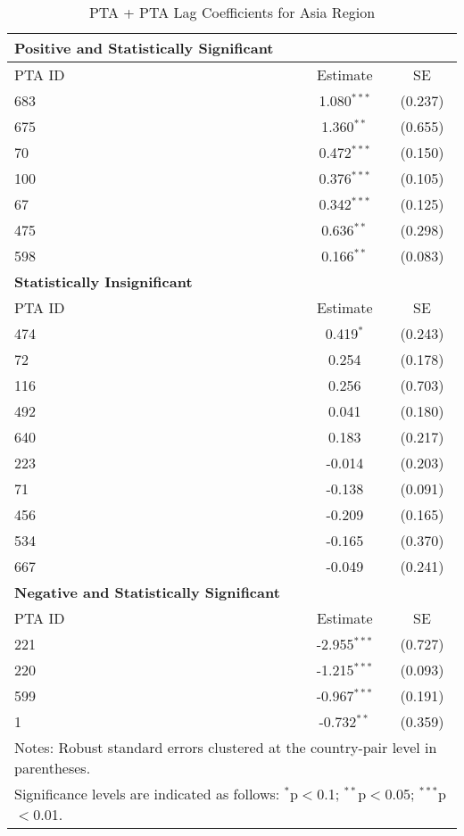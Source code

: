 \begin{table}[htbp]
    \centering
    \caption{PTA + PTA Lag Coefficients for Asia Region}
    \label{tab:pta_asia}
    \begin{adjustbox}{max width=\textwidth}
    \begin{tabular}{lcc}
    \hline
    \textbf{Positive and Statistically Significant} &  &  \\
    \hline
    PTA ID & Estimate & SE \\
    \hline
    683 & 1.080$^{\ast\ast\ast}$ & (0.237) \\
    675 & 1.360$^{\ast\ast}$ & (0.655) \\
    70  & 0.472$^{\ast\ast\ast}$ & (0.150) \\
    100 & 0.376$^{\ast\ast\ast}$ & (0.105) \\
    67  & 0.342$^{\ast\ast\ast}$ & (0.125) \\
    475 & 0.636$^{\ast\ast}$ & (0.298) \\
    598 & 0.166$^{\ast\ast}$ & (0.083) \\
    \hline
    \textbf{Statistically Insignificant} &  &  \\
    \hline
    PTA ID & Estimate & SE \\
    \hline
    474 & 0.419$^{\ast}$ & (0.243) \\
    72  & 0.254 & (0.178) \\
    116 & 0.256 & (0.703) \\
    492 & 0.041 & (0.180) \\
    640 & 0.183 & (0.217) \\
    223 & -0.014 & (0.203) \\
    71  & -0.138 & (0.091) \\
    456 & -0.209 & (0.165) \\
    534 & -0.165 & (0.370) \\
    667 & -0.049 & (0.241) \\
    \hline
    \textbf{Negative and Statistically Significant} &  &  \\
    \hline
    PTA ID & Estimate & SE \\
    \hline
    221 & -2.955$^{\ast\ast\ast}$ & (0.727) \\
    220 & -1.215$^{\ast\ast\ast}$ & (0.093) \\
    599 & -0.967$^{\ast\ast\ast}$ & (0.191) \\
    1   & -0.732$^{\ast\ast}$ & (0.359) \\
    \hline
    \multicolumn{3}{l}{\footnotesize{Notes: Robust standard errors clustered at the country-pair level in parentheses.}} \\
    \multicolumn{3}{l}{\footnotesize{Significance levels are indicated as follows: $^{\ast}$p$<$0.1; $^{\ast\ast}$p$<$0.05; $^{\ast\ast\ast}$p$<$0.01.}} \\
    \end{tabular}
    \end{adjustbox}
\end{table}
